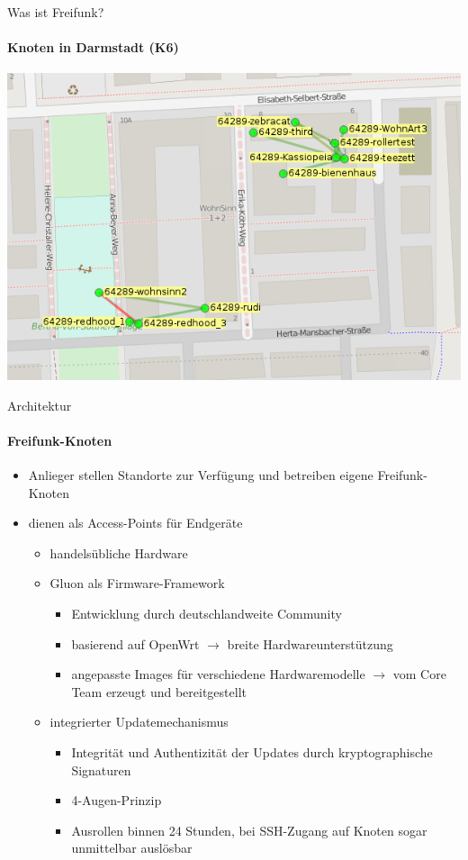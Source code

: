 \documentclass{beamer}
\begin{document}
\begin{frame}{Was ist Freifunk?}
\framesubtitle{Knoten in Darmstadt (K6)}
\begin{center}
\includegraphics[height=0.75\textheight]{images/ffmap_k6}
\end{center}
\end{frame}


\begin{frame}{Architektur}
\framesubtitle{Freifunk-Knoten}
\begin{itemize}
	\item Anlieger stellen Standorte zur Verfügung und betreiben eigene Freifunk-Knoten
	\item dienen als Access-Points für Endgeräte
	\begin{itemize}
		\item handelsübliche Hardware
		\item Gluon als Firmware-Framework
		\begin{itemize}
			\item Entwicklung durch deutschlandweite Community
			\item basierend auf OpenWrt $\rightarrow$ breite Hardwareunterstützung
			\item angepasste Images für verschiedene Hardwaremodelle \newline $\rightarrow$ vom Core Team erzeugt und bereitgestellt
		\end{itemize}
		\item integrierter Updatemechanismus
		\begin{itemize}
			\item Integrität und Authentizität der Updates durch kryptographische Signaturen
			\item 4-Augen-Prinzip
			\item Ausrollen binnen 24 Stunden, bei SSH-Zugang auf Knoten sogar unmittelbar auslösbar
		\end{itemize}
	\end{itemize}
\end{itemize}
\end{frame}
\end{document}
